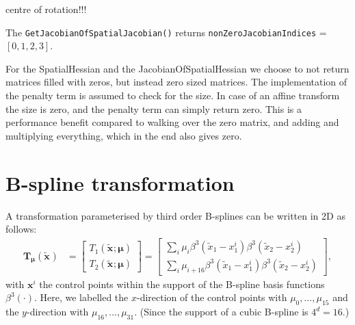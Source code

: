 \documentclass[]{article}
\newcommand{\vmu}{\bm{\mu}}
\newcommand{\vTmu}{\bm{T_{\mu}}}
\newcommand{\vx}[1][]{\bm{x}_{#1}}
\newcommand{\vxt}[1][]{\bm{\widetilde x}_{#1}}
\begin{document}
centre of rotation!!!

The \texttt{GetJacobianOfSpatialJacobian()} returns
\texttt{nonZeroJacobianIndices} = $[ 0, 1, 2, 3 ]$.

For the SpatialHessian and the JacobianOfSpatialHessian we choose to
not return matrices filled with zeros, but instead zero sized
matrices. The implementation of the penalty term is assumed to check
for the size. In case of an affine transform the size is zero, and
the penalty term can simply return zero. This is a performance
benefit compared to walking over the zero matrix, and adding and
multiplying everything, which in the end also gives zero.

\section{B-spline transformation}

A transformation parameterised by third order B-splines can be
written in 2D as follows:
\begin{align}
\vTmu(\vxt) &= \begin{bmatrix} T_1(\vxt;\vmu) \\ T_2(\vxt;\vmu)
\end{bmatrix} = \begin{bmatrix} \sum_{i} \mu_i \beta^3(\widetilde{x}_1 - x_{1}^i)
\beta^3(\widetilde{x}_2 - x_{2}^i) \\ \sum_{i} \mu_{i+16}
\beta^3(\widetilde{x}_1 - x_{1}^i) \beta^3(\widetilde{x}_2 -
x_{2}^i)
\end{bmatrix},
\end{align}
with $\vx^i$ the control points within the support of the B-spline
basis functions $\beta^3(\cdot)$. Here, we labelled the
$x$-direction of the control points with $\mu_0, \ldots, \mu_{15}$
and the $y$-direction with $\mu_{16}, \ldots, \mu_{31}$. (Since the
support of a cubic B-spline is $4^d = 16$.)
\end{document}
